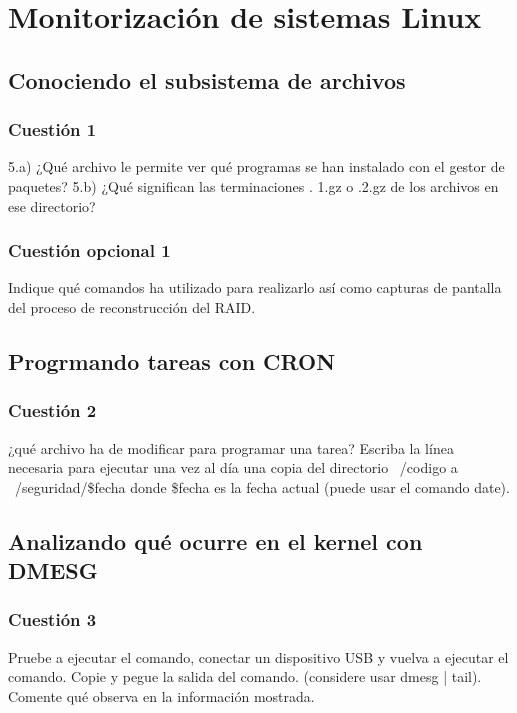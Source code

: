 



\maketitle %
\newpage %
\tableofcontents %
\listoffigures
\newpage

\section{Monitorización de sistemas Linux}
\subsection{Conociendo el subsistema de archivos}
\subsubsection{Cuestión 1}
5.a) ¿Qué archivo le permite ver qué programas se han
instalado con el gestor de paquetes? 5.b) ¿Qué significan las terminaciones .
1.gz o .2.gz de los archivos en ese directorio?
\subsubsection{Cuestión opcional 1}
Indique qué comandos ha utilizado para realizarlo así
como capturas de pantalla del proceso de reconstrucción del RAID.
\subsection{Progrmando tareas con CRON}
\subsubsection{Cuestión 2}
¿qué archivo ha de modificar para programar una tarea?
Escriba la línea necesaria para ejecutar una vez al día una copia del
directorio ~/codigo a ~/seguridad/\$fecha donde \$fecha es la fecha actual
(puede usar el comando date).
\subsection{Analizando qué ocurre en el kernel con DMESG}
\subsubsection{Cuestión 3}
Pruebe a ejecutar el comando, conectar un dispositivo USB y
vuelva a ejecutar el comando. Copie y pegue la salida del comando.
(considere usar dmesg | tail). Comente qué observa en la información
mostrada.
